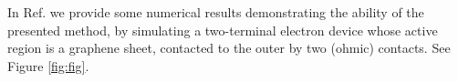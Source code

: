 \documentclass[11pt, a4paper]{article} %
\begin{document}
In Ref. \cite{Thz} we provide some numerical results demonstrating the ability of the presented method, by simulating a two-terminal electron device whose active region is a graphene sheet, contacted to the outer by two (ohmic) contacts. See Figure \ref{fig:fig}. %

\vspace{1cm}
\begin{center}
\null
\vspace{7cm}
\end{center}

\end{document}

